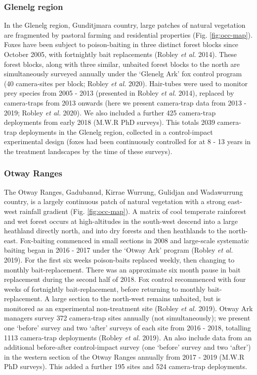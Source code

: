 \documentclass[11pt,a4paper,titlepage,twoside,openright]{style/unimelbthesis}
\begin{document}
\begin{mainmatter}
\hypertarget{glenelg-region}{%
\subsubsection{Glenelg region}\label{glenelg-region}}

In the Glenelg region, Gunditjmara country, large patches of natural vegetation are fragmented by pastoral farming and residential properties (Fig. \ref{fig:occ-map}). Foxes have been subject to poison-baiting in three distinct forest blocks since October 2005, with fortnightly bait replacements (Robley \emph{et al.} 2014). These forest blocks, along with three similar, unbaited forest blocks to the north are simultaneously surveyed annually under the `Glenelg Ark' fox control program (40 camera-sites per block; Robley \emph{et al.} 2020). Hair-tubes were used to monitor prey species from 2005 - 2013 (presented in Robley \emph{et al.} 2014), replaced by camera-traps from 2013 onwards (here we present camera-trap data from 2013 - 2019; Robley \emph{et al.} 2020). We also included a further 425 camera-trap deployments from early 2018 (M.W.R PhD surveys). This totals 2039 camera-trap deployments in the Glenelg region, collected in a control-impact experimental design (foxes had been continuously controlled for at 8 - 13 years in the treatment landscapes by the time of these surveys).

\hypertarget{otway-ranges}{%
\subsubsection{Otway Ranges}\label{otway-ranges}}

The Otway Ranges, Gadubanud, Kirrae Wurrung, Gulidjan and Wadawurrung country, is a largely continuous patch of natural vegetation with a strong east-west rainfall gradient (Fig. \ref{fig:occ-map}). A matrix of cool temperate rainforest and wet forest occurs at high-altitudes in the south-west descend into a large heathland directly north, and into dry forests and then heathlands to the north-east. Fox-baiting commenced in small sections in 2008 and large-scale systematic baiting began in 2016 - 2017 under the `Otway Ark' program (Robley \emph{et al.} 2019). For the first six weeks poison-baits replaced weekly, then changing to monthly bait-replacement. There was an approximate six month pause in bait replacement during the second half of 2018. Fox control recommenced with four weeks of fortnightly bait-replacement, before returning to monthly bait-replacement. A large section to the north-west remains unbaited, but is monitored as an experimental non-treatment site (Robley \emph{et al.} 2019). Otway Ark managers survey 372 camera-trap sites annually (not simultaneously); we present one `before' survey and two `after' surveys of each site from 2016 - 2018, totalling 1113 camera-trap deployments (Robley \emph{et al.} 2019). An also include data from an additional before-after control-impact survey (one `before' survey and two `after') in the western section of the Otway Ranges annually from 2017 - 2019 (M.W.R PhD surveys). This added a further 195 sites and 524 camera-trap deployments.


\end{mainmatter}
\end{document}
